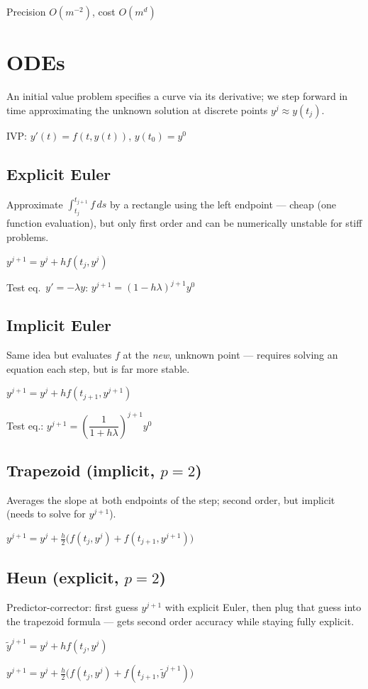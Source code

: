 \documentclass[11pt]{extarticle}
\begin{document}
Precision $O(m^{-2})$, cost $O(m^d)$

\section{ODEs}
An initial value problem specifies a curve via its derivative; we step forward in time approximating the unknown solution at discrete points $y^j\approx y(t_j)$.

IVP: $y'(t)=f(t,y(t))$, $y(t_0)=y^0$

\subsection{Explicit Euler}
Approximate $\int_{t_j}^{t_{j+1}}f\,ds$ by a rectangle using the left endpoint --- cheap (one function evaluation), but only first order and can be numerically unstable for stiff problems.

$y^{j+1}=y^j+hf(t_j,y^j)$

Test eq.\ $y'=-\lambda y$: $y^{j+1}=(1-h\lambda)^{j+1}y^0$

\subsection{Implicit Euler}
Same idea but evaluates $f$ at the \emph{new}, unknown point --- requires solving an equation each step, but is far more stable.

$y^{j+1}=y^j+hf(t_{j+1},y^{j+1})$

Test eq.: $y^{j+1}=\left(\dfrac1{1+h\lambda}\right)^{j+1}y^0$

\subsection{Trapezoid (implicit, $p=2$)}
Averages the slope at both endpoints of the step; second order, but implicit (needs to solve for $y^{j+1}$).

$y^{j+1}=y^j+\tfrac h2\big(f(t_j,y^j)+f(t_{j+1},y^{j+1})\big)$

\subsection{Heun (explicit, $p=2$)}
Predictor-corrector: first guess $y^{j+1}$ with explicit Euler, then plug that guess into the trapezoid formula --- gets second order accuracy while staying fully explicit.

$\tilde y^{j+1}=y^j+hf(t_j,y^j)$

$y^{j+1}=y^j+\tfrac h2\big(f(t_j,y^j)+f(t_{j+1},\tilde y^{j+1})\big)$
\end{document}
